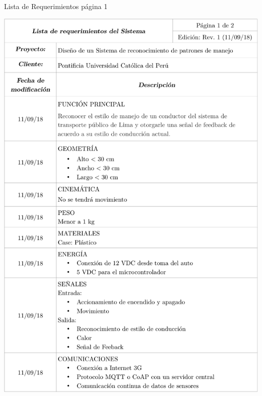\begin{table}[htbp!]
  \caption{Lista de Requerimientos página 1}
  \label{diag:2.1}
  \includegraphics[width=1.05\linewidth]{Tab1.pdf}
\end{table}

\newpage

